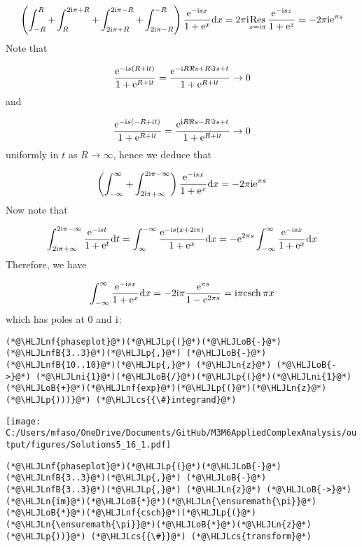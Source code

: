 \documentclass[12pt,landscape]{article}
\newcommand{\HLJLn}[1]{#1}
\newcommand{\HLJLnf}[1]{\textcolor[RGB]{66,102,213}{#1}}
\newcommand{\HLJLnfB}[1]{\textcolor[RGB]{59,151,46}{#1}}
\newcommand{\HLJLni}[1]{\textcolor[RGB]{59,151,46}{#1}}
\newcommand{\HLJLoB}[1]{\textcolor[RGB]{102,102,102}{\textbf{#1}}}
\newcommand{\HLJLp}[1]{#1}
\newcommand{\HLJLcs}[1]{\textcolor[RGB]{153,153,119}{\textit{#1}}}
\def\D{ {\rm d} }
\def\I{ {\rm i} }
\def\E{ {\rm e} }
\def\Res_#1{\underset{#1}{\rm Res}\,}
\def\dx{\D x}
\def\dt{\D t}
\begin{document}
{\[
\left(\int_{-R}^R + \int_R^{2\I \pi + R} +  \int_{2 \I \pi + R}^{2\I \pi - R} + \int_{2 \I \pi - R}^{-R} \right) {\E^{-\I s x} \over 1 + \E^x} \dx = 2 \pi \I \Res_{z = \I \pi } {\E^{-\I s z} \over 1 + \E^z} =
- 2 \pi \I \E^{\pi s}
\]
Note that

\[
{\E^{-\I s (R + \I t)} \over 1 + \E^{R + \I t}} =
{\E^{-\I R \Re s + R \Im s  + t} \over 1 + \E^{R + \I t}} \rightarrow 0
\]
and

\[
{\E^{-\I s (-R + \I t)} \over 1 + \E^{R + \I t}} =
{\E^{\I R \Re s - R \Im s + t} \over 1 + \E^{R + \I t}} \rightarrow 0
\]
uniformly in $t$ as $R \rightarrow \infty$, hence we deduce that

\[
\left(\int_{-\infty}^\infty  +  \int_{2 \I \pi + \infty}^{2\I \pi - \infty}\right) {\E^{-\I s x} \over 1 + \E^x} \dx  =
- 2 \pi \I \E^{\pi s}
\]
Now note that

\[
\int_{2 \I \pi + \infty}^{2\I \pi - \infty} {\E^{-\I s t} \over 1 + \E^t} \dt  = \int_{\infty}^{-\infty} {\E^{-\I s (x+2 \I \pi)} \over 1 + \E^x} \dx = -\E^{2 \pi s} \int_{-\infty}^\infty  {\E^{-\I s x} \over 1 + \E^x} \dx
\]
Therefore, we have

\[
\int_{-\infty}^\infty  {\E^{-\I s x} \over 1 + \E^x} \dx  = - 2 \I \pi {\E^{\pi s} \over 1 -\E^{2 \pi s}} = \I \pi {\rm csch}\, \pi x
\]
which has poles at $0$ and $\I$:


\begin{lstlisting}
(*@\HLJLnf{phaseplot}@*)(*@\HLJLp{(}@*)(*@\HLJLoB{-}@*)(*@\HLJLnfB{3..3}@*)(*@\HLJLp{,}@*) (*@\HLJLoB{-}@*)(*@\HLJLnfB{10..10}@*)(*@\HLJLp{,}@*) (*@\HLJLn{z}@*) (*@\HLJLoB{->}@*) (*@\HLJLni{1}@*)(*@\HLJLoB{/}@*)(*@\HLJLp{(}@*)(*@\HLJLni{1}@*)(*@\HLJLoB{+}@*)(*@\HLJLnf{exp}@*)(*@\HLJLp{(}@*)(*@\HLJLn{z}@*)(*@\HLJLp{)))}@*) (*@\HLJLcs{{\#}integrand}@*)
\end{lstlisting}

\texttt{[image: C:/Users/mfaso/OneDrive/Documents/GitHub/M3M6AppliedComplexAnalysis/output/figures/Solutions5\_16\_1.pdf]}

\begin{lstlisting}
(*@\HLJLnf{phaseplot}@*)(*@\HLJLp{(}@*)(*@\HLJLoB{-}@*)(*@\HLJLnfB{3..3}@*)(*@\HLJLp{,}@*) (*@\HLJLoB{-}@*)(*@\HLJLnfB{3..3}@*)(*@\HLJLp{,}@*) (*@\HLJLn{z}@*) (*@\HLJLoB{->}@*) (*@\HLJLn{im}@*)(*@\HLJLoB{*}@*)(*@\HLJLn{\ensuremath{\pi}}@*)(*@\HLJLoB{*}@*)(*@\HLJLnf{csch}@*)(*@\HLJLp{(}@*)(*@\HLJLn{\ensuremath{\pi}}@*)(*@\HLJLoB{*}@*)(*@\HLJLn{z}@*)(*@\HLJLp{))}@*) (*@\HLJLcs{{\#}}@*) (*@\HLJLcs{transform}@*)
\end{lstlisting}

}
\end{document}
